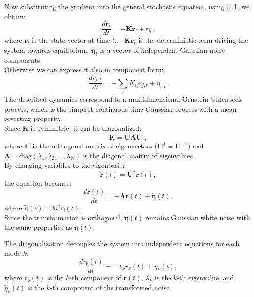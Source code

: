 \documentclass[English, Lau, oneside]{sapthesis}
\begin{document}
Now substituting the gradient into the general stochastic equation, using \eqref{1.1} we obtain:
\begin{equation}
\frac{d\mathbf{r}_t}{dt} = -\mathbf{K} \mathbf{r}_t + \boldsymbol{\eta}_t,
\end{equation}
where \( \mathbf{r}_t \) is the state vector at time \( t \), \( -\mathbf{K} \mathbf{r}_t \) is the deterministic term driving the system towards equilibrium, \( \boldsymbol{\eta}_t \) is a vector of independent Gaussian noise components.\\
Otherwise we can express it also in component form:
\begin{equation}
    \frac{d r_{i,t}}{dt} = -\sum_j K_{ij} r_{j,t} + \eta_{i,t}.
\end{equation}
The described dynamics correspond to a multidimensional Ornstein-Uhlenbeck process, which is the simplest continuous-time Gaussian process with a mean-reverting property.\\
Since \(\mathbf{K}\) is symmetric, it can be diagonalized:
\[
\mathbf{K} = \mathbf{U} \boldsymbol{\Lambda} \mathbf{U}^\dagger,
\]
where  \(\mathbf{U}\) is the orthogonal matrix of eigenvectors (\(\mathbf{U}^\dagger = \mathbf{U}^{-1}\)) and \(\boldsymbol{\Lambda} = \text{diag}(\lambda_1, \lambda_2, \dots, \lambda_N)\) is the diagonal matrix of eigenvalues.\\
By changing variables to the eigenbasis:
\[
\tilde{\mathbf{r}}(t) = \mathbf{U}^\dagger \mathbf{r}(t),
\]
the equation becomes:
\[
\frac{d \tilde{\mathbf{r}}(t)}{dt} = -\boldsymbol{\Lambda} \tilde{\mathbf{r}}(t) + \tilde{\boldsymbol{\eta}}(t),
\]
where \(\tilde{\boldsymbol{\eta}}(t) = \mathbf{U}^\dagger \boldsymbol{\eta}(t)\).\\
Since the transformation is orthogonal, \(\tilde{\boldsymbol{\eta}}(t)\) remains Gaussian white noise with the same properties as \(\boldsymbol{\eta}(t)\).

The diagonalization decouples the system into independent equations for each mode \(k\):
\[
\frac{d \tilde{r}_k(t)}{dt} = -\lambda_k \tilde{r}_k(t) + \tilde{\eta}_k(t),
\]
where \(\tilde{r}_k(t)\) is the \(k\)-th component of \(\tilde{\mathbf{r}}(t)\), \(\lambda_k\) is the \(k\)-th eigenvalue, and \(\tilde{\eta}_k(t)\) is the \(k\)-th component of the transformed noise.
\end{document}
